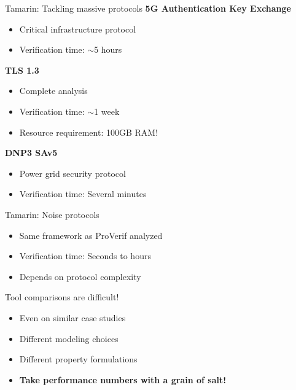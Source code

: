 \documentclass[aspectratio=169, lualatex, handout]{beamer}
\begin{document}
\begin{frame}{Tamarin: Tackling massive protocols}
	\textbf{5G Authentication Key Exchange}
	\begin{itemize}
		\item Critical infrastructure protocol
		\item Verification time: $\sim$5 hours
	\end{itemize}
	\vspace{0.5em}
	\textbf{TLS 1.3}
	\begin{itemize}
		\item Complete analysis
		\item Verification time: $\sim$1 week
		\item Resource requirement: 100GB RAM!
	\end{itemize}
	\vspace{0.5em}
	\textbf{DNP3 SAv5}
	\begin{itemize}
		\item Power grid security protocol
		\item Verification time: Several minutes
	\end{itemize}
\end{frame}

\begin{frame}{Tamarin: Noise protocols}
	\begin{itemize}
		\item Same framework as ProVerif analyzed
		\item Verification time: Seconds to hours
		\item Depends on protocol complexity
	\end{itemize}
	\vspace{1em}
	\begin{center}
		\Large
		Tool comparisons are difficult!
	\end{center}
	\vspace{0.5em}
	\begin{itemize}
		\item Even on similar case studies
		\item Different modeling choices
		\item Different property formulations
		\item \textbf{Take performance numbers with a grain of salt!}
	\end{itemize}
\end{frame}
\end{document}
